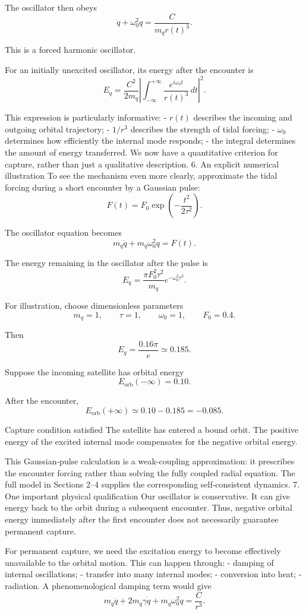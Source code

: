 The oscillator then obeys
\[
\ddot q+\omega_0^2q
=\frac{C}{m_qr(t)^3}.
\]

This is a forced harmonic oscillator.

For an initially unexcited oscillator, its energy after the encounter is
\[
\boxed{
E_q=
\frac{C^2}{2m_q}
\left|
\int_{-\infty}^{+\infty}
\frac{e^{i\omega_0t}}{r(t)^3}\,dt
\right|^2.
}
\]

This expression is particularly informative:
- \(r(t)\) describes the incoming and outgoing orbital trajectory;
- \(1/r^3\) describes the strength of tidal forcing;
- \(\omega_0\) determines how efficiently the internal mode responds;
- the integral determines the amount of energy transferred.
We now have a quantitative criterion for capture, rather than just a qualitative description.
6. An explicit numerical illustration
To see the mechanism even more clearly, approximate the tidal forcing during a short encounter by a Gaussian pulse:
\[
F(t)=F_0\exp\left(-\frac{t^2}{2\tau^2}\right).
\]

The oscillator equation becomes
\[
m_q\ddot q+m_q\omega_0^2q=F(t).
\]

The energy remaining in the oscillator after the pulse is
\[
\boxed{
E_q=
\frac{\pi F_0^2\tau^2}{m_q}
e^{-\omega_0^2\tau^2}.
}
\]

For illustration, choose dimensionless parameters
\[
m_q=1,\qquad \tau=1,\qquad
\omega_0=1,\qquad F_0=0.4.
\]

Then
\[
E_q=\frac{0.16\pi}{e}
\simeq 0.185.
\]

Suppose the incoming satellite has orbital energy
\[
E_{\mathrm{orb}}(-\infty)=0.10.
\]

After the encounter,
\[
E_{\mathrm{orb}}(+\infty)
\simeq 0.10-0.185=-0.085.
\]

Capture condition satisfied
The satellite has entered a bound orbit. The positive energy of the excited internal mode compensates for the negative orbital energy.

This Gaussian-pulse calculation is a weak-coupling approximation: it prescribes the encounter forcing rather than solving the fully coupled radial equation. The full model in Sections 2–4 supplies the corresponding self-consistent dynamics.
7. One important physical qualification
Our oscillator is conservative. It can give energy back to the orbit during a subsequent encounter. Thus, negative orbital energy immediately after the first encounter does not necessarily guarantee permanent capture.

For permanent capture, we need the excitation energy to become effectively unavailable to the orbital motion. This can happen through:
- damping of internal oscillations;
- transfer into many internal modes;
- conversion into heat;
- radiation.
A phenomenological damping term would give
\[
m_q\ddot q+
2m_q\gamma\dot q+
m_q\omega_0^2q
=\frac{C}{r^3}.
\]

